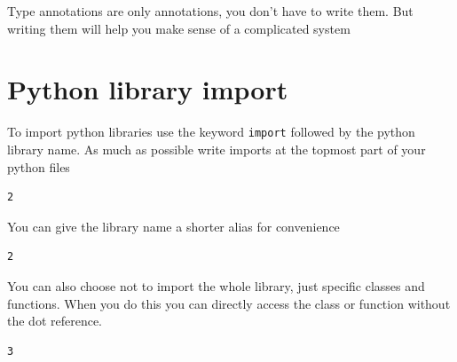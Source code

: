 Type annotations are only annotations, you don't have to write them. But
writing them will help you make sense of a complicated system

\section{Python library
import}\label{python-introduction.md__python-library-import}

To import python libraries use the keyword \texttt{import} followed by
the python library name. As much as possible write imports at the
topmost part of your python files

\begin{Shaded}
\begin{Highlighting}[]
\NormalTok{)}
\end{Highlighting}
\end{Shaded}

\begin{verbatim}
2
\end{verbatim}

You can give the library name a shorter alias for convenience

\begin{Shaded}
\begin{Highlighting}[]
\NormalTok{)}
\end{Highlighting}
\end{Shaded}

\begin{verbatim}
2
\end{verbatim}

You can also choose not to import the whole library, just specific
classes and functions. When you do this you can directly access the
class or function without the dot reference.

\begin{Shaded}
\begin{Highlighting}[]
\NormalTok{) }\OperatorTok{+}\NormalTok{)}
\end{Highlighting}
\end{Shaded}

\begin{verbatim}
3
\end{verbatim}

